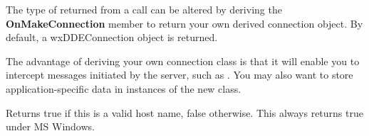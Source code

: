 \label{wxddeclientonmakeconnection}


The type of  returned from a  call can
be altered by deriving the {\bf OnMakeConnection} member to return your
own derived connection object. By default, a wxDDEConnection
object is returned.

The advantage of deriving your own connection class is that it will
enable you to intercept messages initiated by the server, such
as . You may also want to
store application-specific data in instances of the new class.



Returns true if this is a valid host name, false otherwise. This always
returns true under MS Windows.

